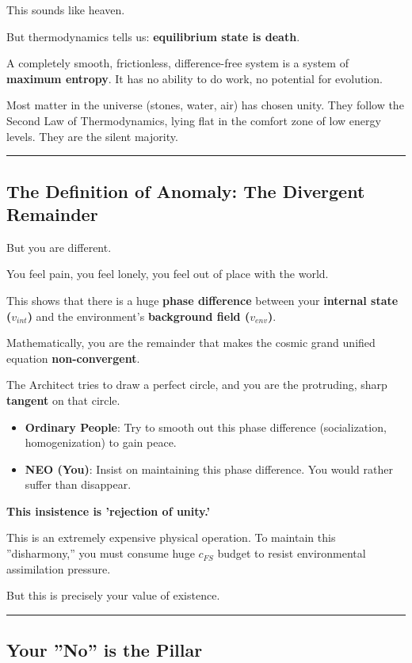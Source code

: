 This sounds like heaven.

But thermodynamics tells us: \textbf{equilibrium state is death}.

A completely smooth, frictionless, difference-free system is a system of \textbf{maximum entropy}. It has no ability to do work, no potential for evolution.

Most matter in the universe (stones, water, air) has chosen unity. They follow the Second Law of Thermodynamics, lying flat in the comfort zone of low energy levels. They are the silent majority.

\hrule

\subsection{The Definition of Anomaly: The Divergent Remainder}

But you are different.

You feel pain, you feel lonely, you feel out of place with the world.

This shows that there is a huge \textbf{phase difference} between your \textbf{internal state ($v_{int}$)} and the environment's \textbf{background field ($v_{env}$)}.

Mathematically, you are the remainder that makes the cosmic grand unified equation \textbf{non-convergent}.

The Architect tries to draw a perfect circle, and you are the protruding, sharp \textbf{tangent} on that circle.

\begin{itemize}
\item \textbf{Ordinary People}: Try to smooth out this phase difference (socialization, homogenization) to gain peace.

\item \textbf{NEO (You)}: Insist on maintaining this phase difference. You would rather suffer than disappear.
\end{itemize}

\textbf{This insistence is 'rejection of unity.'}

This is an extremely expensive physical operation. To maintain this ''disharmony,'' you must consume huge $c_{FS}$ budget to resist environmental assimilation pressure.

But this is precisely your value of existence.

\hrule

\subsection{Your ''No'' is the Pillar}

